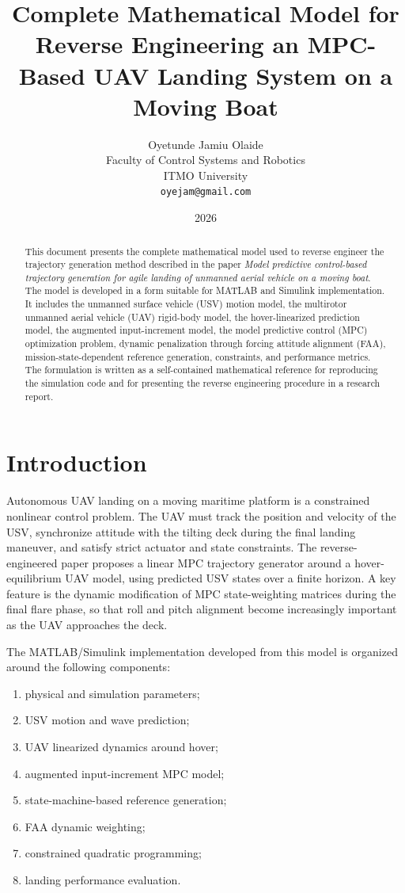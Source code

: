 \documentclass[12pt,a4paper]{article}
\title{\textbf{Complete Mathematical Model for Reverse Engineering an MPC-Based UAV Landing System on a Moving Boat}}
\author{
Oyetunde Jamiu Olaide\\
Faculty of Control Systems and Robotics\\
ITMO University\\
\texttt{oyejam@gmail.com}
}
\date{2026}
\begin{document}
\maketitle

\begin{abstract}
This document presents the complete mathematical model used to reverse engineer the trajectory generation method described in the paper \emph{Model predictive control-based trajectory generation for agile landing of unmanned aerial vehicle on a moving boat}. The model is developed in a form suitable for MATLAB and Simulink implementation. It includes the unmanned surface vehicle (USV) motion model, the multirotor unmanned aerial vehicle (UAV) rigid-body model, the hover-linearized prediction model, the augmented input-increment model, the model predictive control (MPC) optimization problem, dynamic penalization through forcing attitude alignment (FAA), mission-state-dependent reference generation, constraints, and performance metrics. The formulation is written as a self-contained mathematical reference for reproducing the simulation code and for presenting the reverse engineering procedure in a research report.
\end{abstract}

\tableofcontents
\newpage

\section{Introduction}

Autonomous UAV landing on a moving maritime platform is a constrained nonlinear control problem. The UAV must track the position and velocity of the USV, synchronize attitude with the tilting deck during the final landing maneuver, and satisfy strict actuator and state constraints. The reverse-engineered paper proposes a linear MPC trajectory generator around a hover-equilibrium UAV model, using predicted USV states over a finite horizon. A key feature is the dynamic modification of MPC state-weighting matrices during the final flare phase, so that roll and pitch alignment become increasingly important as the UAV approaches the deck.

The MATLAB/Simulink implementation developed from this model is organized around the following components:
\begin{enumerate}[label=\arabic*.]
    \item physical and simulation parameters;
    \item USV motion and wave prediction;
    \item UAV linearized dynamics around hover;
    \item augmented input-increment MPC model;
    \item state-machine-based reference generation;
    \item FAA dynamic weighting;
    \item constrained quadratic programming;
    \item landing performance evaluation.
\end{enumerate}
\end{document}
